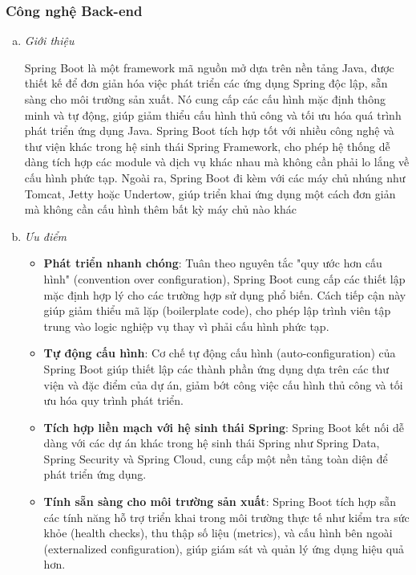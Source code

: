 \subsubsection{Công nghệ Back-end}
    \begin{enumerate}[(a)]
        \item \textit{Giới thiệu}

        Spring Boot là một framework mã nguồn mở dựa trên nền tảng Java, được thiết kế để đơn giản hóa việc phát triển các ứng dụng Spring độc lập, sẵn sàng cho môi trường sản xuất. Nó cung cấp các cấu hình mặc định thông minh và tự động, giúp giảm thiểu cấu hình thủ công và tối ưu hóa quá trình phát triển ứng dụng Java. Spring Boot tích hợp tốt với nhiều công nghệ và thư viện khác trong hệ sinh thái Spring Framework, cho phép hệ thống dễ dàng tích hợp các module và dịch vụ khác nhau mà không cần phải lo lắng về cấu hình phức tạp. Ngoài ra, Spring Boot đi kèm với các máy chủ nhúng như Tomcat, Jetty hoặc Undertow, giúp triển khai ứng dụng một cách đơn giản mà không cần cấu hình thêm bất kỳ máy chủ nào khác
        
        \item \textit{Ưu điểm} \cite{SpringBootBenefits}

        \begin{itemize}
            \item \textbf{Phát triển nhanh chóng}: Tuân theo nguyên tắc "quy ước hơn cấu hình" (convention over configuration), Spring Boot cung cấp các thiết lập mặc định hợp lý cho các trường hợp sử dụng phổ biến. Cách tiếp cận này giúp giảm thiểu mã lặp (boilerplate code), cho phép lập trình viên tập trung vào logic nghiệp vụ thay vì phải cấu hình phức tạp. 
            \item \textbf{Tự động cấu hình}: Cơ chế tự động cấu hình (auto-configuration) của Spring Boot giúp thiết lập các thành phần ứng dụng dựa trên các thư viện và đặc điểm của dự án, giảm bớt công việc cấu hình thủ công và tối ưu hóa quy trình phát triển.
            \item \textbf{Tích hợp liền mạch với hệ sinh thái Spring}: Spring Boot kết nối dễ dàng với các dự án khác trong hệ sinh thái Spring như Spring Data, Spring Security và Spring Cloud, cung cấp một nền tảng toàn diện để phát triển ứng dụng.
            \item \textbf{Tính sẵn sàng cho môi trường sản xuất}: Spring Boot tích hợp sẵn các tính năng hỗ trợ triển khai trong môi trường thực tế như kiểm tra sức khỏe (health checks), thu thập số liệu (metrics), và cấu hình bên ngoài (externalized configuration), giúp giám sát và quản lý ứng dụng hiệu quả hơn.
        \end{itemize}
        

\end{enumerate}
